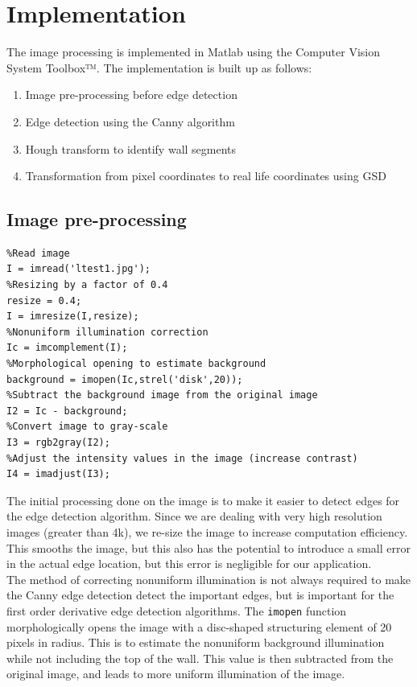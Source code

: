 \section{Implementation}
\label{implementation}
The image processing is implemented in Matlab using the Computer Vision System Toolbox™. The implementation is built up as follows:
\begin{enumerate}
\item Image pre-processing before edge detection
\item Edge detection using the Canny algorithm
\item Hough transform to identify wall segments
\item Transformation from pixel coordinates to real life coordinates using GSD
\end{enumerate}

\subsection{Image pre-processing}
\begin{lstlisting}
%Read image
I = imread('ltest1.jpg');
%Resizing by a factor of 0.4
resize = 0.4;
I = imresize(I,resize);
%Nonuniform illumination correction
Ic = imcomplement(I);
%Morphological opening to estimate background
background = imopen(Ic,strel('disk',20));
%Subtract the background image from the original image
I2 = Ic - background;
%Convert image to gray-scale
I3 = rgb2gray(I2);
%Adjust the intensity values in the image (increase contrast)
I4 = imadjust(I3);
\end{lstlisting}
The initial processing done on the image is to make it easier to detect edges for the edge detection algorithm. Since we are dealing with very high resolution images (greater than 4k), we re-size the image to increase computation efficiency. This smooths the image, but this also has the potential to introduce a small error in the actual edge location, but this error is negligible for our application. \\

The method of correcting nonuniform illumination is not always required to make the Canny edge detection detect the important edges, but is important for the first order derivative edge detection algorithms. The \texttt{imopen} function morphologically opens the image with a disc-shaped structuring element of 20 pixels in radius. This is to estimate the nonuniform background illumination while not including the top of the wall. This value is then subtracted from the original image, and leads to more uniform illumination of the image.\\

